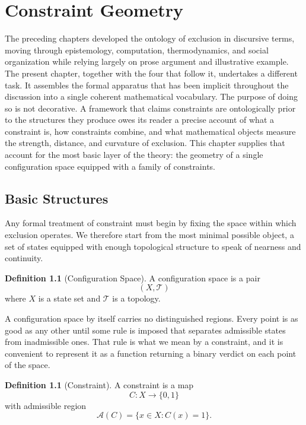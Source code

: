 \documentclass[11pt,oneside]{book}
\theoremstyle{plain}
\theoremstyle{definition}
\newtheorem{definition}[theorem]{Definition}
\theoremstyle{remark}
\begin{document}
\appendix

\chapter{Constraint Geometry}

The preceding chapters developed the ontology of exclusion in discursive terms, moving through epistemology, computation, thermodynamics, and social organization while relying largely on prose argument and illustrative example. The present chapter, together with the four that follow it, undertakes a different task. It assembles the formal apparatus that has been implicit throughout the discussion into a single coherent mathematical vocabulary. The purpose of doing so is not decorative. A framework that claims constraints are ontologically prior to the structures they produce owes its reader a precise account of what a constraint is, how constraints combine, and what mathematical objects measure the strength, distance, and curvature of exclusion. This chapter supplies that account for the most basic layer of the theory: the geometry of a single configuration space equipped with a family of constraints.

\section{Basic Structures}

Any formal treatment of constraint must begin by fixing the space within which exclusion operates. We therefore start from the most minimal possible object, a set of states equipped with enough topological structure to speak of nearness and continuity.

\begin{definition}[Configuration Space]
A configuration space is a pair
\[
(X,\mathcal{T})
\]
where
\(X\) is a state set and
\(\mathcal{T}\) is a topology.
\end{definition}

A configuration space by itself carries no distinguished regions. Every point is as good as any other until some rule is imposed that separates admissible states from inadmissible ones. That rule is what we mean by a constraint, and it is convenient to represent it as a function returning a binary verdict on each point of the space.

\begin{definition}[Constraint]
A constraint is a map
\[
C:X\to\{0,1\}
\]
with admissible region
\[
\mathcal{A}(C)
=
\{x\in X:C(x)=1\}.
\]
\end{definition}
\end{document}

